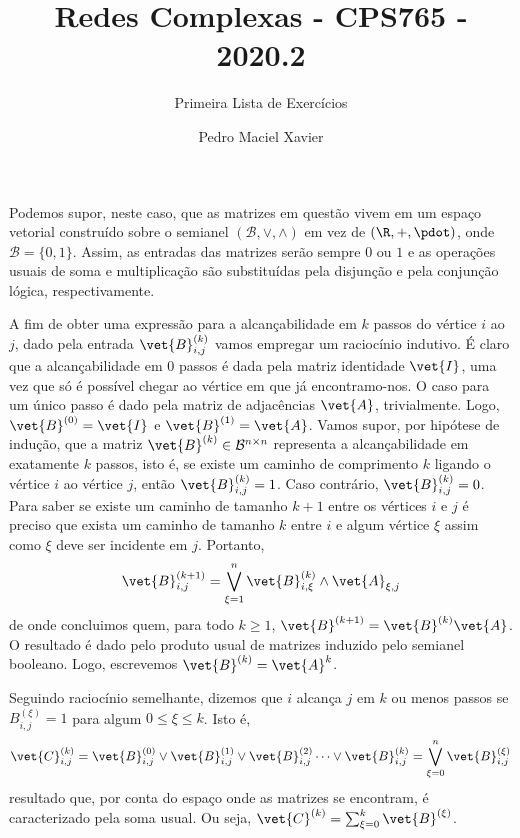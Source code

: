\documentclass[l15, tikzdraw]{homework}
\title{Redes Complexas - CPS765 - 2020.2}
\subtitle{Primeira Lista de Exercícios}
\author{Pedro Maciel Xavier}
\begin{document}
	\maketitle*%

	Podemos supor, neste caso, que as matrizes em questão vivem em um espaço vetorial construído sobre o semianel $(\mathcal{B}, \vee, \wedge)$ em vez de $(\R, +, \pdot)$, onde $\mathcal{B} = \{0, 1\}$. Assim, as entradas das matrizes serão sempre $0$ ou $1$ e as operações usuais de soma e multiplicação são substituídas pela disjunção e pela conjunção lógica, respectivamente.
	
	\subsubquest%
	A fim de obter uma expressão para a alcançabilidade em $k$ passos do vértice $i$ ao $j$, dado pela entrada $\vet{B}_{i, j}^{(k)}$ vamos empregar um raciocínio indutivo. É claro que a alcançabilidade em $0$ passos é dada pela matriz identidade $\vet{I}$, uma vez que só é possível chegar ao vértice em que já encontramo-nos. O caso para um único passo é dado pela matriz de adjacências $\vet{A}$, trivialmente. Logo, $\vet{B}^{(0)} = \vet{I}$ e $\vet{B}^{(1)} = \vet{A}$. Vamos supor, por hipótese de indução, que a matriz $\vet{B}^{(k)} \in \mathcal{B}^{n \times n}$ representa a alcançabilidade em exatamente $k$ passos, isto é, se existe um caminho de comprimento $k$ ligando o vértice $i$ ao vértice $j$, então $\vet{B}^{(k)}_{i, j} = 1$. Caso contrário, $\vet{B}^{(k)}_{i, j} = 0$. Para saber se existe um caminho de tamanho $k + 1$ entre os vértices $i$ e $j$ é preciso que exista um caminho de tamanho $k$ entre $i$ e algum vértice $\xi$ assim como $\xi$ deve ser incidente em $j$. Portanto,%
		$$\vet{B}^{(k + 1)}_{i, j} = \bigvee_{\xi = 1}^{n} \vet{B}^{(k)}_{i, \xi} \wedge \vet{A}_{\xi, j}$$
	de onde concluimos quem, para todo $k \ge 1$, $\vet{B}^{(k + 1)}= \vet{B}^{(k)} \vet{A}$. O resultado é dado pelo produto usual de matrizes induzido pelo semianel booleano. Logo, escrevemos $\vet{B}^{(k)} = \vet{A}^{k}$.
	
	\subsubquest%
	Seguindo raciocínio semelhante, dizemos que $i$ alcança $j$ em $k$ ou menos passos se $B^{(\xi)}_{i,j} = 1$ para algum $0 \le \xi \le k$. Isto é,%
		$$\vet{C}_{i, j}^{(k)} = \vet{B}_{i, j}^{(0)} \vee \vet{B}_{i, j}^{(1)} \vee \vet{B}_{i, j}^{(2)} \dots \vee \vet{B}_{i, j}^{(k)} = \bigvee_{\xi = 0}^{n} \vet{B}_{i, j}^{(\xi)}$$
	resultado que, por conta do espaço onde as matrizes se encontram, é caracterizado pela soma usual. Ou seja, $\vet{C}^{(k)} = \sum_{\xi=0}^{k} \vet{B}^{(\xi)}$.
\end{document}
